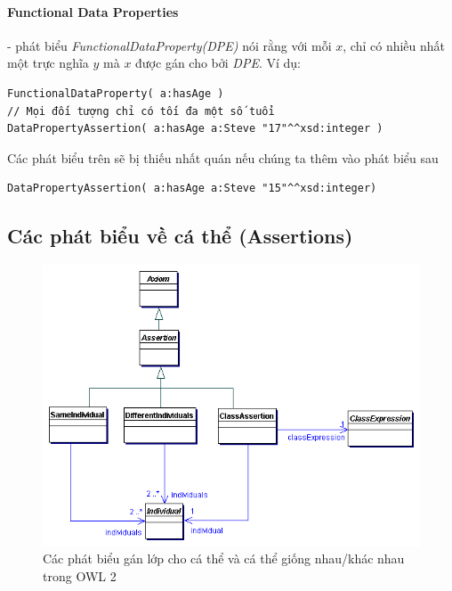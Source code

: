 \paragraph{Functional Data Properties} - phát biểu \textit{FunctionalDataProperty(DPE)} nói rằng với mỗi $x$, chỉ có nhiều nhất một trực nghĩa $y$ mà $x$ được gán cho bởi \textit{DPE}. Ví dụ:
\begin{verbatim}
FunctionalDataProperty( a:hasAge )
// Mọi đối tượng chỉ có tối đa một số tuổi
DataPropertyAssertion( a:hasAge a:Steve "17"^^xsd:integer )
\end{verbatim}
Các phát biểu trên sẽ bị thiếu nhất quán nếu chúng ta thêm vào phát biểu sau 
\begin{verbatim}
DataPropertyAssertion( a:hasAge a:Steve "15"^^xsd:integer)
\end{verbatim}

\subsection{Các phát biểu về cá thể (Assertions)} 
\begin{figure}[H]
	\centering
	\includegraphics[width=120mm]{Figures/abox1.png}
	\caption{Các phát biểu gán lớp cho cá thể và cá thể giống nhau/khác nhau trong OWL 2 \label{overflow}}
\end{figure}

